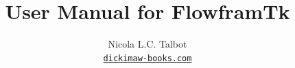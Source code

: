 \newcommand{\rendered}{\glslink{rendering}{rendered}}

\newcommand{\filefn}[1]{\menuitem{file.#1}}
\newcommand{\editfn}[1]{\menuitem{edit.#1}}
\newcommand{\transformfn}[1]{\menuitem{transform.#1}}

\newcommand{\degrees}[1]{#1\textdegree}

\newcommand{\pagestyleref}[1]{\opt{page-style.#1}}
\newcommand{\framelabelref}[1]{\opt{frame-label.#1}}
\newcommand{\setframeopt}[1]{\opt{settypeframe.#1}}
\newcommand{\setframeoptval}[2]{\optval{settypeframe.#1}{#2}}

\newcommand*{\radialcoords}[2]{$(#1:#2)$}
\newcommand*{\radiusmark}{\ensuremath{r}}
\newcommand*{\anglemark}{\ensuremath{\theta}}

\newcommand*{\typedef}[1]{\inlineglsdef{ajdr-format.#1}}
\newcommand*{\type}[1]{\gls{ajdr-format.#1}}
\newcommand*{\typepl}[1]{\glspl{ajdr-format.#1}}


%
{}
{}


\subtitle{\bigskip{}\bigskip}


\GlsXtrLoadResources[src={flowframtk,shared,\langbibsrcs},
 \TeXJavaHelpSymbolResourceOptions
]

\GlsXtrLoadResources[src={flowframtk,shared,\langbibsrcs},
 \TeXJavaHelpGlsResourceOptions
]

\providecommand{\FlowframTk}{FlowframTk}

\title{User Manual for \FlowframTk}
\author{Nicola L.C. Talbot\\\href{https://www.dickimaw-books.com/}{\nolinkurl{dickimaw-books.com}}}


\maketitle

